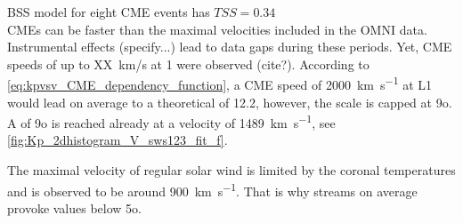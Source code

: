 {BSS model for eight CME events has $\mathit{TSS} = 0.34$ \citep[Tab.~3]{Savani2017}\\




CMEs can be faster than the maximal velocities included in the OMNI data. Instrumental effects (specify...) lead to data gaps during these periods. Yet, CME speeds of up to XX~km/s at \SI{1}{\au} were observed (cite?). According to \autoref{eq:kpvsv_CME_dependency_function}, a CME speed of \SI{2000}{\km\per\s} at L1 would lead on average to a theoretical \Kp{} of 12.2, however, the \Kp{} scale is capped at 9o. A \Kp{} of 9o is reached already at a velocity of \SI{1489}{\km\per\s}, see \autoref{fig:Kp_2dhistogram_V_sws123_fit_f}.
\begin{figure}
\end{figure}

The maximal velocity of regular solar wind is limited by the coronal temperatures \citep{Parker1958} and is observed to be around \SI{900}{\km\per\s}. That is why streams on average provoke \Kp{} values below 5o.\\

}
